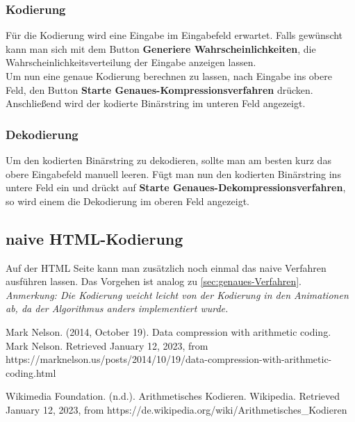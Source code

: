\documentclass[a4paper]{article}
\theoremstyle{definition}
\theoremstyle{remark}
\begin{document}
\subsubsection{Kodierung}
Für die Kodierung wird eine Eingabe im Eingabefeld erwartet. Falls gewünscht kann man sich mit dem Button \textbf{Generiere Wahrscheinlichkeiten}, die Wahrscheinlichkeitsverteilung der Eingabe anzeigen lassen.
\\
Um nun eine genaue Kodierung berechnen zu lassen, nach Eingabe ins obere Feld, den Button \textbf{Starte Genaues-Kompressionsverfahren} drücken.
\\
Anschließend wird der kodierte Binärstring im unteren Feld angezeigt.\\

\subsubsection{Dekodierung}
Um den kodierten Binärstring zu dekodieren, sollte man am besten kurz das obere Eingabefeld manuell leeren. Fügt man nun den kodierten Binärstring ins untere Feld ein und drückt auf \textbf{Starte Genaues-Dekompressionsverfahren}, so wird einem die Dekodierung im oberen Feld angezeigt.


\subsection{naive HTML-Kodierung}
Auf der HTML Seite kann man zusätzlich noch einmal das naive Verfahren ausführen lassen. Das Vorgehen ist analog zu \ref{sec:genaues-Verfahren}.\\
\textit{Anmerkung: Die Kodierung weicht leicht von der Kodierung in den Animationen ab, da der Algorithmus anders implementiert wurde.}


	
	
	

		
		\newpage
	
	\begin{thebibliography}{2}
		 Mark Nelson. (2014, October 19). Data compression with arithmetic coding. Mark Nelson. Retrieved January 12, 2023, from https://marknelson.us/posts/2014/10/19/data-compression-with-arithmetic-coding.html 
		
		 Wikimedia Foundation. (n.d.). Arithmetisches Kodieren. Wikipedia. Retrieved January 12, 2023, from https://de.wikipedia.org/wiki/Arithmetisches\_Kodieren
	\end{thebibliography}
\end{document}
